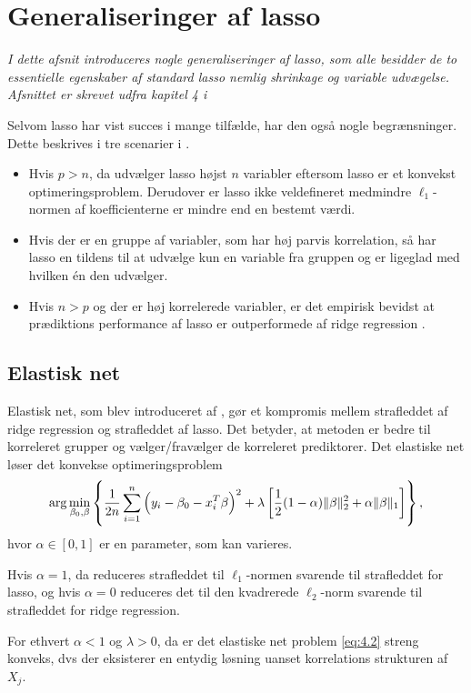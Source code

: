 \section{Generaliseringer af lasso}
\textit{I dette afsnit introduceres nogle generaliseringer af lasso, som alle besidder de to essentielle egenskaber af standard lasso nemlig shrinkage og variable udvægelse.
Afsnittet er skrevet udfra kapitel 4 i \citep{hastie}}

Selvom lasso har vist succes i mange tilfælde, har den også nogle begrænsninger. Dette beskrives i tre scenarier i \citep{zou_hastie} . 
\begin{itemize}
\item Hvis $p>n$, da udvælger lasso højst $n$ variabler eftersom lasso er et konvekst optimeringsproblem. Derudover er lasso ikke veldefineret medmindre $\ell_1$-normen af koefficienterne er mindre end en bestemt værdi. 
\item Hvis der er en gruppe af variabler, som har høj parvis korrelation, så har lasso en tildens til at udvælge kun en variable fra gruppen og er ligeglad med hvilken én den udvælger. 
\item Hvis $n>p$ og der er høj korrelerede variabler, er det empirisk bevidst at prædiktions performance af lasso er outperformede af ridge regression \citep{lasso}. 
\end{itemize}

\subsection{Elastisk net}
Elastisk net, som blev introduceret af \citep{zou_hastie}, gør et kompromis mellem strafleddet af ridge regression og strafleddet af lasso.
Det betyder, at metoden er bedre til korreleret grupper og vælger/fravælger de korreleret prediktorer.
Det elastiske net løser det konvekse optimeringsproblem
\begin{align}
\arg \min_{\beta_0, \beta} \cbr{\frac{1}{2n} \sum_{i=1}^n \del{y_i - \beta_0 - x_{i}^T \beta}^2 + \lambda \sbr{\frac{1}{2} (1- \alpha) \Vert \beta \Vert_2^2 + \alpha \Vert \beta \Vert_1}}, \label{eq:4.2}
\end{align}
hvor $\alpha \in [0,1]$ er en parameter, som kan varieres. 

Hvis $\alpha=1$, da reduceres strafleddet til $\ell_1$-normen svarende til strafleddet for lasso, og hvis $\alpha=0$ reduceres det til den kvadrerede $\ell_2$-norm svarende til strafleddet for ridge regression.

For ethvert $\alpha<1$ og $\lambda>0$, da er det elastiske net problem \eqref{eq:4.2} streng konveks, dvs der eksisterer en entydig løsning uanset korrelations strukturen af $X_j$.

